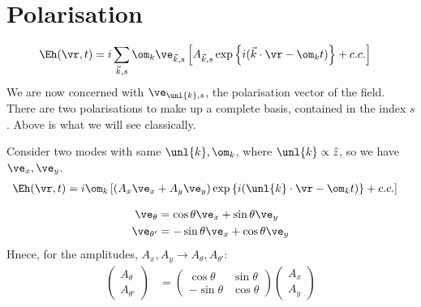 \documentclass[a4paper, 11pt, normalem]{report}
\begin{document}
\section{Polarisation}
\begin{align}
    \Eh(\vr,t) &= i\sum_{\vec{k},s} \om_k\ve_{\vec{k},s}\left[A_{\vec{k},s}\exp\left\{i(\vec{k}\cdot\vr-\om_kt)\right\}+ c.c.\right]
\end{align}
We are now concerned with $\ve_{\unl{k},s}$, the polarisation vector of the field.
There are two polarisations to make up a complete basis, contained in the index $s$.
Above is what we will see classically. 

Consider two modes with same $\unl{k},\om_k$, where $\unl{k}\propto\hat{z}$, so we have $\ve_x,\ve_y$.
\begin{align}
    \Eh(\vr,t) &= i\om_k\left[(A_x\ve_x+A_y\ve_y)\exp\left\{i(\unl{k}\cdot\vr-\om_kt)\right\} + c.c.\right]
\end{align}
\begin{figure}[H]
    \centering
    \vspace{-40pt}
\end{figure}
\begin{align}
    \ve_\theta &= \cos\theta\ve_x + \sin\theta\ve_y \\
    \ve_{\theta'} &= -\sin\theta\ve_x + \cos\theta\ve_y
\end{align}
Hnece, for the amplitudes, $A_x,A_y\to A_\theta,A_{\theta'}$:
\begin{align}
    \begin{pmatrix}A_\theta \\ A_{\theta'} \end{pmatrix} &= \begin{pmatrix}\cos\theta & \sin\theta \\ -\sin\theta & \cos\theta\end{pmatrix} \begin{pmatrix}A_x \\A_y\end{pmatrix}
\end{align}
\end{document}
